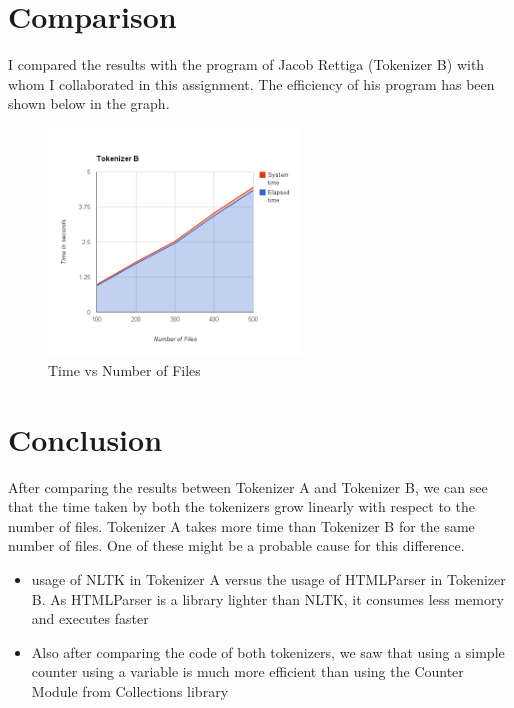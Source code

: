 \documentclass[11pt]{article} %
\begin{document}

\section{Comparison} %

I compared the results with the program of Jacob Rettiga (Tokenizer B) with whom I collaborated in this assignment. The efficiency of his program has been shown below in the graph.   

\begin{figure}[h] %
  \begin{center}
    \includegraphics[width=0.6\textwidth]{tokenizerB.png}
  \end{center}
  \caption{Time vs Number of Files}
\end{figure}


\section{Conclusion}

After comparing the results between Tokenizer A and Tokenizer B, we can see that the time taken by both the tokenizers grow linearly with respect to the number of files. Tokenizer A takes more time than Tokenizer B for the same number of files. One of these might be a probable cause for this difference.

\begin{itemize}
\item usage of NLTK in Tokenizer A versus the usage of HTMLParser in Tokenizer B. As HTMLParser is a library lighter than NLTK, it consumes less memory and executes faster
\item Also after comparing the code of both tokenizers, we saw that using a simple counter using a variable is much more efficient than using the Counter Module from Collections library
\end{itemize}
\end{document}
